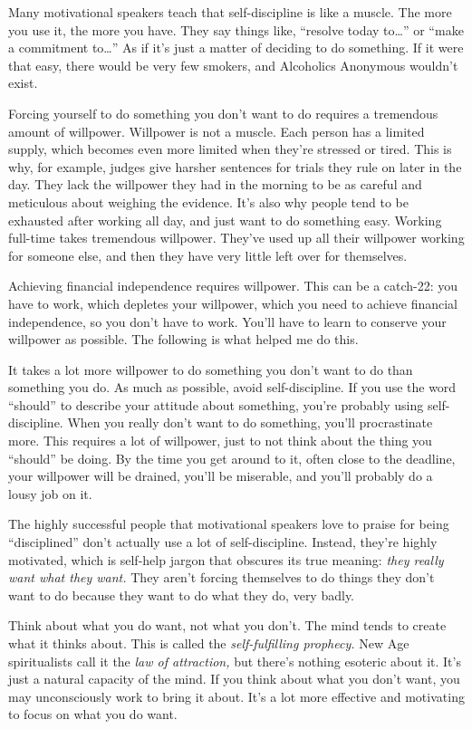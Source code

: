 Many motivational speakers teach that self-discipline is like a muscle. The more you use it, the more you have. They say things like, ``resolve today to\ldots'' or ``make a commitment to\ldots'' As if it's just a matter of deciding to do something. If it were that easy, there would be very few smokers, and Alcoholics Anonymous wouldn't exist.

Forcing yourself to do something you don't want to do requires a tremendous amount of willpower. Willpower is not a muscle. Each person has a limited supply, which becomes even more limited when they're stressed or tired. This is why, for example, judges give harsher sentences for trials they rule on later in the day. They lack the willpower they had in the morning to be as careful and meticulous about weighing the evidence. It's also why people tend to be exhausted after working all day, and just want to do something easy. Working full-time takes tremendous willpower. They've used up all their willpower working for someone else, and then they have very little left over for themselves.

Achieving financial independence requires willpower. This can be a catch-22: you have to work, which depletes your willpower, which you need to achieve financial independence, so you don't have to work. You'll have to learn to conserve your willpower as possible. The following is what helped me do this.

It takes a lot more willpower to do something you don't want to do than something you do. As much as possible, avoid self-discipline. If you use the word ``should'' to describe your attitude about something, you're probably using self-discipline. When you really don't want to do something, you'll procrastinate more. This requires a lot of willpower, just to not think about the thing you ``should'' be doing. By the time you get around to it, often close to the deadline, your willpower will be drained, you'll be miserable, and you'll probably do a lousy job on it.

The highly successful people that motivational speakers love to praise for being ``disciplined'' don't actually use a lot of self-discipline. Instead, they're highly motivated, which is self-help jargon that obscures its true meaning: \emph{they really want what they want.} They aren't forcing themselves to do things they don't want to do because they want to do what they do, very badly.

Think about what you do want, not what you don't. The mind tends to create what it thinks about. This is called the \emph{self-fulfilling prophecy.} New Age spiritualists call it the \emph{law of attraction,} but there's nothing esoteric about it. It's just a natural capacity of the mind. If you think about what you don't want, you may unconsciously work to bring it about. It's a lot more effective and motivating to focus on what you do want.

